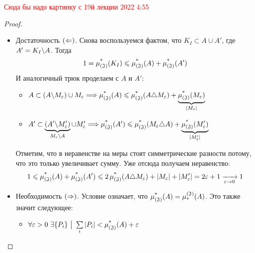 \textcolor{red}{Сюда бы надо картинку с 19й лекции 2022 4:55}

\begin{proof}~
	\begin{itemize}
		\item Достаточность $(\La)$. Снова воспользуемся фактом, что $K_I \subset A \cup A'$, где $A' = K_I \bs A$. Тогда
		\[
			1 = \upjlm(K_I) \le \upjlm(A) + \upjlm(A')
		\]
		И аналогичный трюк проделаем с $A$ и $A'$:
		\begin{itemize}
			\item \(A \subset (A \bs M_\eps) \cup M_\eps \Longrightarrow \upjlm(A) \le \upjlm(A \tr M_\eps) + \underbrace{\upjlm(M_\eps)}_{|M_\eps|}\)
			
			\item \(A' \subset \underbrace{(A' \bs M'_\eps)}_{M_\eps \bs A} \cup M'_\eps \Longrightarrow \upjlm(A') \le \upjlm(M_\eps \tr A) + \underbrace{\upjlm(M'_\eps)}_{|M'_\eps|}\)
		\end{itemize}
		Отметим, что в неравенстве на меры стоят симметрические разности потому, что это только увеличивает сумму. Уже отсюда получаем неравенство:
		\[
			1 \le \upjlm(A) + \upjlm(A') \le 2\upjlm(A \tr M_\eps) + |M_\eps| + |M'_\eps| = 2\eps + 1 \xrightarrow[\eps \to 0]{} 1
		\]
		
		\item Необходимость $(\Ra)$. Условие означает, что $\upjlm(A) = \downjlm(A)$. Это также значит следующее:
		\begin{itemize}
			\item \(\forall \eps > 0\ \exists \{P_i\} \such \suml_i |P_i| < \upjlm(A) + \eps\)
			

\end{itemize}
\end{itemize}
\end{proof}
